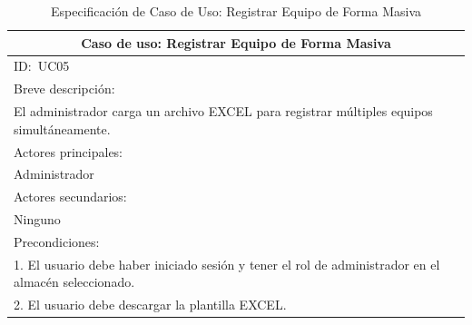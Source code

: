 \documentclass[stu, 12pt, letterpaper, donotrepeattitle, floatsintext, natbib]{apa7}
\begin{document}
\newpage
\begin{longtable}{@{} p{16.5cm} @{}}
    \caption{Especificación de Caso de Uso: Registrar Equipo de Forma Masiva}\label{tab:UC05}                                                                          \\ \toprule
    \multicolumn{1}{c}{Caso de uso: Registrar Equipo de Forma Masiva}                                                                                                  \\ \midrule
    ID:~UC05                                                                                                                                                           \\ \midrule
    Breve descripción:                                                                                                                                                 \\
    El administrador carga un archivo EXCEL para registrar múltiples equipos simultáneamente.                                                                          \\ \midrule
    Actores principales:                                                                                                                                               \\
    Administrador                                                                                                                                                      \\ \midrule
    Actores secundarios:                                                                                                                                               \\
    Ninguno                                                                                                                                                            \\ \midrule
    Precondiciones:                                                                                                                                                    \\
    1. El usuario debe haber iniciado sesión y tener el rol de administrador en el almacén seleccionado.                                                               \\
    2. El usuario debe descargar la plantilla EXCEL.                                                                                                                   \\

\end{longtable}
\end{document}
